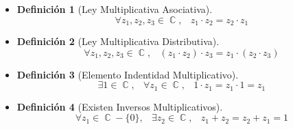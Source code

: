 \documentclass[12pt, fleqn]{report}                             %
\DeclareMathOperator \Space     {\quad}                         %
\DeclareMathOperator \MiniSpace {\;}                            %
\newtheorem{Definition}     {Definición}[section]               %
\theoremstyle{break}                                            %
\DeclareMathOperator \Complexs     {\mathbb{C}}                 %
\begin{document}
\begin{itemize}
                \item 
                    \begin{Definition}[Ley Multiplicativa Asociativa]
                        \begin{equation}
                            \forall z_1, z_2, z_3 \in \Complexs, \MiniSpace
                                z_1  \cdot z_2 = z_2 \cdot z_1
                        \end{equation}
                    \end{Definition}

                \item 
                    \begin{Definition}[Ley Multiplicativa Distributiva]
                        \begin{equation}
                            \forall z_1, z_2, z_3 \in \Complexs, \MiniSpace
                                (z_1  \cdot z_2)  \cdot z_3 = z_1  \cdot (z_2  \cdot z_3)
                        \end{equation}
                    \end{Definition}

                \item
                    \begin{Definition}[Elemento Indentidad Multiplicativo]
                        \begin{equation}
                            \exists 1 \in \Complexs, \MiniSpace
                                \forall z_1 \in \Complexs, \MiniSpace 1 \cdot z_1 = z_1  \cdot 1 = z_1
                        \end{equation}
                    \end{Definition}

                \item
                    \begin{Definition}[Existen Inversos Multiplicativos]
                        \begin{equation}
                            \forall z_1 \in \Complexs - \{0\}, \MiniSpace
                                \exists z_2 \in \Complexs, \MiniSpace
                                    z_1  + z_2= z_2 + z_1 = 1
                        \end{equation}
                    \end{Definition}

                \end{itemize}
\end{document}
